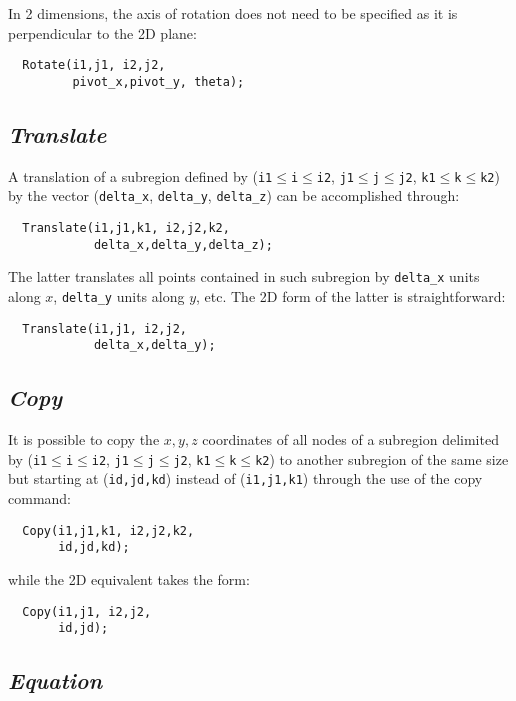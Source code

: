 \documentclass{warpdoc}
\begin{document}
In 2 dimensions, the axis of rotation does not need to be specified
as it is perpendicular to the 2D plane:
%
\begin{verbatim}
  Rotate(i1,j1, i2,j2,
         pivot_x,pivot_y, theta);
\end{verbatim}
%



\subsection{\emph{Translate}}

A translation of a subregion defined by
(\verb|i1|$\leq$\verb|i|$\leq$\verb|i2|,
  \verb|j1|$\leq$\verb|j|$\leq$\verb|j2|,
  \verb|k1|$\leq$\verb|k|$\leq$\verb|k2|)
by the vector (\verb|delta_x|, \verb|delta_y|, \verb|delta_z|)
can be accomplished through:
%
\begin{verbatim}
  Translate(i1,j1,k1, i2,j2,k2,
            delta_x,delta_y,delta_z);
\end{verbatim}
%
The latter  translates all points contained in such subregion by
 \verb|delta_x| units along $x$, \verb|delta_y| units along $y$, etc.
The 2D form of the latter is straightforward:
%
\begin{verbatim}
  Translate(i1,j1, i2,j2,
            delta_x,delta_y);
\end{verbatim}
%


\subsection{\emph{Copy}}

It is possible to copy the $x, y, z$ coordinates of all nodes
of a subregion delimited by
(\verb|i1|$\leq$\verb|i|$\leq$\verb|i2|,
  \verb|j1|$\leq$\verb|j|$\leq$\verb|j2|,
  \verb|k1|$\leq$\verb|k|$\leq$\verb|k2|)
to another subregion of the same size but starting
at (\verb|id,jd,kd|) instead of (\verb|i1,j1,k1|) through the use
of the copy command:
%
\begin{verbatim}
  Copy(i1,j1,k1, i2,j2,k2,
       id,jd,kd);
\end{verbatim}
%
while the 2D equivalent takes the form:
%
\begin{verbatim}
  Copy(i1,j1, i2,j2,
       id,jd);
\end{verbatim}
%


\subsection{\emph{Equation}}
\end{document}
